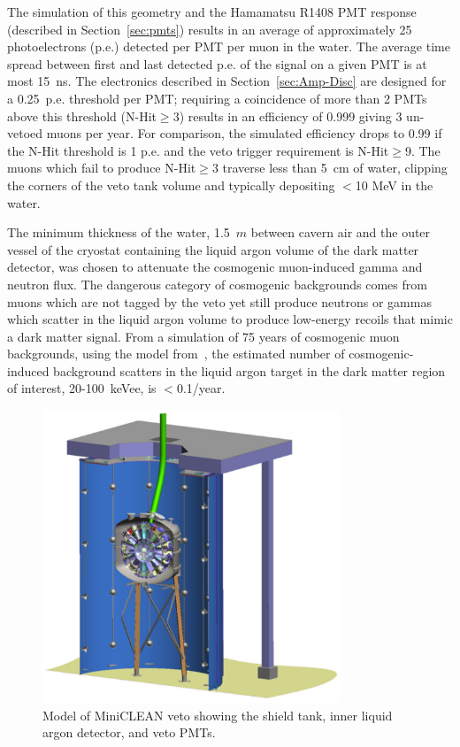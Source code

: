 \documentclass[review,number,sort&compress]{elsarticle}
\begin{document}
The simulation of this geometry and the Hamamatsu R1408 PMT response
(described in Section~\ref{sec:pmts}) results in an average of
approximately 25 photoelectrons (p.e.) detected per PMT per muon in
the water. The average time spread between first and last detected
p.e. of the signal on a given PMT is at most 15~ns. The electronics
described in Section~\ref{sec:Amp-Disc} are designed for a 0.25~p.e.
threshold per PMT; requiring a coincidence of more than 2 PMTs above
this threshold (N-Hit$\ge$3) results in an efficiency of 0.999 giving
3 un-vetoed muons per year. For comparison, the simulated efficiency
drops to 0.99 if the N-Hit threshold is 1 p.e. and the veto trigger
requirement is N-Hit$\ge$9. The muons which fail to produce N-Hit$\ge$3
traverse less than 5~cm of water, clipping the corners of the veto
tank volume and typically depositing $<$10 MeV in the water. 

The minimum thickness of the water, 1.5~$m$ between cavern air and the
outer vessel of the cryostat containing the liquid argon volume of the
dark matter detector, was chosen to attenuate the cosmogenic
muon-induced gamma and neutron flux.  The dangerous category of
cosmogenic backgrounds comes from muons which are not tagged by the
veto yet still produce neutrons or gammas which scatter in the liquid
argon volume to produce low-energy recoils that mimic a dark matter
signal.  From a simulation of 75 years of cosmogenic muon backgrounds,
using the model from~\cite{ref:mei_and_hime}, the estimated number of
cosmogenic-induced background scatters in the liquid argon target in
the dark matter region of interest, 20-100~keVee, is $<$0.1/year.

\begin{figure}[ht]
\begin{center}
\includegraphics[width=3.5in]{graphics/miniclean_overview_drawing.pdf}
\caption{Model of MiniCLEAN veto showing the shield tank, inner liquid argon detector, and veto PMTs.
\label{fig:veto_geom}}
\end{center}
\end{figure}
\end{document}
